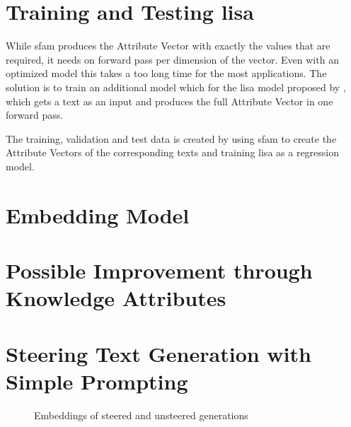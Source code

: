 \section{Training and Testing \acs{lisa}}
\label{sec:approach:lisa}
While \ac{sfam} produces the Attribute Vector with exactly the values that are required, it needs on forward pass per dimension of the vector. Even with an optimized model this takes a too long time for the most applications. The solution is to train an additional model which for the \acf{lisa} model proposed by \citet{patelLearningInterpretableStyle2023}, which gets a text as an input and produces the full Attribute Vector in one forward pass.

The training, validation and test data is created by using \ac{sfam} to create the Attribute Vectors of the corresponding texts and training \ac{lisa} as a regression model.


\section{Embedding Model}
\label{sec:approach:embedding}



\section{Possible Improvement through Knowledge Attributes}
\label{sec:approach:knowledgeAttributes}


\section{Steering Text Generation with Simple Prompting}
\label{sec:approach:steering:simple}
\begin{figure}
  \begin{center}
    
    \caption{Embeddings of steered and unsteered generations}
  \end{center}
\end{figure}


